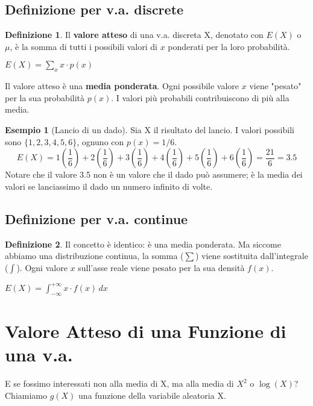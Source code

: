 \documentclass[a4paper, 11pt]{article}
\theoremstyle{definition}
\newtheorem{definizione}{Definizione}[section]
\newtheorem{esempio}{Esempio}[section]
\begin{document}
\subsection{Definizione per v.a. discrete}
\begin{definizione}
Il \textbf{valore atteso} di una v.a. discreta X, denotato con $E(X)$ o $\mu$, è la somma di tutti i possibili valori di $x$ ponderati per la loro probabilità.
\begin{formulabox}
    $E(X) = \sum_{x} x \cdot p(x)$
\end{formulabox}
Il valore atteso è una \textbf{media ponderata}. Ogni possibile valore $x$ viene "pesato" per la sua probabilità $p(x)$. I valori più probabili contribuiscono di più alla media.
\end{definizione}

\begin{esempio}[Lancio di un dado]
Sia X il risultato del lancio. I valori possibili sono $\{1, 2, 3, 4, 5, 6\}$, ognuno con $p(x) = 1/6$.
\[ E(X) = 1\left(\frac{1}{6}\right) + 2\left(\frac{1}{6}\right) + 3\left(\frac{1}{6}\right) + 4\left(\frac{1}{6}\right) + 5\left(\frac{1}{6}\right) + 6\left(\frac{1}{6}\right) = \frac{21}{6} = 3.5 \]
Notare che il valore 3.5 non è un valore che il dado può assumere; è la media dei valori se lanciassimo il dado un numero infinito di volte.
\end{esempio}

\subsection{Definizione per v.a. continue}
\begin{definizione}
Il concetto è identico: è una media ponderata. Ma siccome abbiamo una distribuzione continua, la somma ($\sum$) viene sostituita dall'integrale ($\int$). Ogni valore $x$ sull'asse reale viene pesato per la sua densità $f(x)$.
\begin{formulabox}
    $E(X) = \int_{-\infty}^{+\infty} x \cdot f(x) \, dx$
\end{formulabox}
\end{definizione}

\newpage

\section{Valore Atteso di una Funzione di una v.a.}
E se fossimo interessati non alla media di X, ma alla media di $X^2$ o $\log(X)$?
Chiamiamo $g(X)$ una funzione della variabile aleatoria X.
\end{document}
